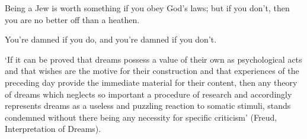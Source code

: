 \begin{enumerate}
\begin{statement}{Being a Jew is worth something if you obey God’s laws; but if you don’t, then you are no better off than a heathen.}
\end{statement}

\begin{statement}{You’re damned if you do, and you’re damned if you don’t.}
\end{statement}

\begin{statement}{‘If it can be proved that dreams possess a value of their own
    as psychological acts and that wishes are the motive for their construction
    and that experiences of the preceding day provide the immediate material for
    their content, then any theory of dreams which neglects so important a
    procedure of research and accordingly represents dreams as a useless and
    puzzling reaction to somatic stimuli, stands condemned without there being
    any necessity for specific criticism’ (Freud, Interpretation of Dreams).}
\end{statement}

\end{enumerate}

